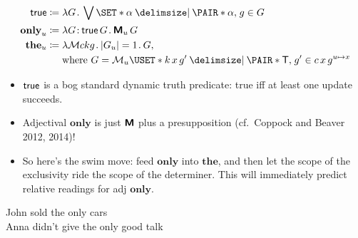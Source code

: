 \documentclass[10pt,fleqn]{article}
\newcommand{\M}{\text{\sffamily\bfseries M}}
\begin{document}
\begin{minipage}[t]{0.5\textwidth} %
\begin{align*}
  \cn{true} &\coloneq
  \l G \dt \bigvee\set{\alpha \giv \pair{\alpha}{g} \in G} \\
  \textbf{only}_u &\coloneq 
  \l G \col \cn{true}\,G \dt \M_u\,G \\
  \textbf{the}_u &\coloneq
  \l \mathcal{M}ckg \dt |G_u| = 1 \dt G, \\
  &\hphantom{{}\coloneq{}}
    \text{where}\ 
    G = \mathcal{M}_u\uset{%
      k\,x\,g'
    \giv
      \pair{\cn{T}}{g'} \in c\,x\,g^{u\mapsto x}
    }
\end{align*}
\end{minipage}
%
%
\begin{minipage}[t]{0.5\textwidth} %
\begin{spreadlines}{0pt}
\begin{itemize}
  \item
    ${\sf true}$ is a bog standard dynamic truth predicate: true iff at least
    one update succeeds.
  \item
    Adjectival $\textbf{only}$ is just $\M$ plus a presupposition (cf.\
    Coppock and Beaver 2012, 2014)!
  \item
    So here's the swim move: feed $\textbf{only}$ into $\textbf{the}$, and
    then let the scope of the exclusivity ride the scope of the determiner.
    This will immediately predict relative readings for adj $\textbf{only}$.
\end{itemize}
\end{spreadlines}
\end{minipage}

\dotfill

John sold the only cars \\

Anna didn't give the only good talk

\dotfill
\end{document}
